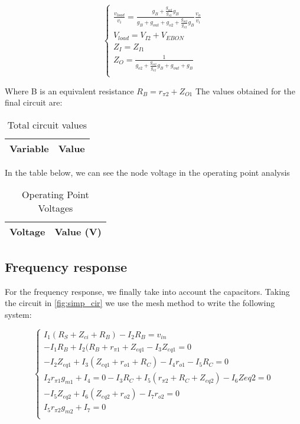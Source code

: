 \begin{equation}\label{eq:final}
\begin{cases}
\frac{v_{load}}{v_i}=\frac{g_B+\frac{g_{m2}}{g_{\pi 2}} g_B}{g_B+g_{out}+g_{o2}+\frac{g_{m2}}{g_{\pi 2}} g_B} \frac{v_o}{v_i}\\
V_{load}=V_{I2}+ V_{EBON}\\
Z_I=Z_{I1}\\
Z_O=\frac{1}{g_{o2}+\frac{g_{m2}}{g_{\pi 2}} g_B+g_{out}+g_B}\\
\end{cases}
\end{equation}

Where B is an equivalent resistance $R_B=r_{\pi 2} + Z_{O1}$
The values obtained for the final circuit are:

\begin{table}[H]
  \centering
  \begin{tabular}{|l|r|}
    \hline    
    {\bf Variable} & {\bf Value} \\ \hline
    
  \end{tabular}
  \caption{Total circuit values}
  \label{tab:sim1}
\end{table}

In the table below, we can see the node voltage in the operating point analysis

\begin{table}[H]
  \centering
  \begin{tabular}{|l|r|}
    \hline    
    {\bf Voltage} & {\bf Value (V)} \\ \hline
    
  \end{tabular}
  \caption{Operating Point Voltages}
  \label{tab:OP}
\end{table}

\subsection{Frequency response}
For the frequency response, we finally take into account the capacitors. Taking the circuit in \ref{fig:simp_cir} we use the mesh method to write the following system:

\begin{equation}\label{eq:freq}
\begin{cases}
I_1 (R_S+Z_{ci}+R_B) - I_2 R_B = v_{in}\\
-I_1 R_B +I_2 (R_B+r_{\pi 1} + Z_{eq1} -I_3 Z_{eq1} = 0\\
-I_2 Z_{eq1} + I_3 (Z_{eq1} + r_{o1} + R_C) -I_4 r_{o1} - I_5 R_C =0\\
I_2 r_{\pi 1} g_{m1} + I_4 = 0
-I_3 R_C + I_5 (r_{\pi 2} + R_C + Z_{eq2}) - I_6 Z{eq2} = 0\\
-I_5 Z_{eq2}+ I_6 (Z_{eq2} + r_{o2}) - I_7 r_{o2} =0\\
I_5 r_{\pi 2} g_{m2} +I_7 = 0\\
\end{cases}
\end{equation}

